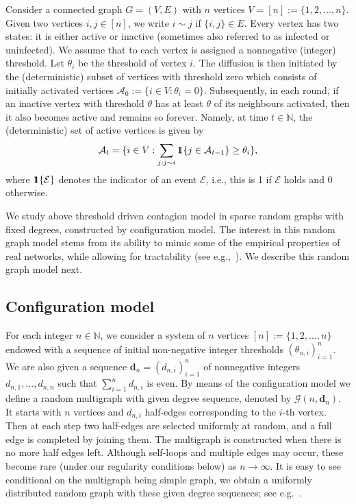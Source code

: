 \documentclass[11pt]{article}
\def\NN{\mathbb{N}}
\def\ind{{\rm 1\hspace{-0.90ex}1}}
\newcommand{\cE}{\mathcal{E}}
\newcommand{\cA}{\mathcal{A}}
\newcommand{\cG}{\mathcal{G}}
\newcommand\bd{\mathbf{d}}
\begin{document}
Consider a connected graph $G=(V,E)$ with $n$ vertices $V=[n]:=\{1,2, \dots, n\}$. Given two vertices $i,j \in [n]$, we write $i \sim j$ if $\{i,j\} \in E$. Every vertex has two states: it is either active or inactive (sometimes also referred to as infected or uninfected). We assume that to each vertex is assigned a  nonnegative (integer) threshold. Let $\theta_i$ be the threshold of vertex $i$. The diffusion is then initiated by the (deterministic) subset of vertices with threshold zero which consists of initially activated vertices 
$\cA_0:=\{i\in V: \theta_i=0\}.$ Subsequently, in each round, if an inactive vertex with threshold $\theta$ has at least $\theta$ of its neighbours activated, then it also becomes active and remains so forever. Namely, at time $t\in \NN$, the (deterministic) set of active vertices is given by
\begin{equation}
\cA_{t}=\{i\in V: \sum_{j: j\sim i} \ind{\{j\in \cA_{t-1}\}} \geq \theta_i\},
\end{equation}
where $\ind{\{\cE\}}$  denotes the indicator of an event $\cE$, i.e., this is 1 if $\cE$ holds and 0 otherwise.


We study above threshold driven contagion model in sparse random graphs with fixed degrees, constructed by configuration model. The interest in this random graph model stems from its ability to mimic some of the empirical properties of real networks, while allowing for tractability (see e.g.,~\cite{Molloy95, hofstad16, durrett07}). We describe this random graph model next.




\subsection{Configuration model}

For each integer $n\in \mathbb{N}$, we consider a system of $n$ vertices $[n] :=\{1,2, \dots,n\}$ endowed with a sequence of initial non-negative integer thresholds $(\theta_{n,i})_{i=1}^n$. We are also given a sequence $\bd_n = (d_{n,i})_{i=1}^n$ of nonnegative integers
$d_{n,1},\ldots,d_{n,n}$ such that $\sum_{i=1}^n d_{n,i}$ is even. By means of the configuration model we define a random multigraph with given degree sequence, denoted by $\cG(n,\bd_n)$. It starts with $n$ vertices and $d_{n,i}$ half-edges corresponding to the $i$-th vertex. Then at each step two half-edges are selected uniformly at random, and a full edge is completed by joining them. The multigraph is constructed when there is no more half edges left. Although self-loops and multiple edges may occur, these become rare (under our regularity conditions below) as $n \to \infty$. It is easy to see conditional on the multigraph being simple graph, we obtain a uniformly distributed random graph with these given degree sequences; see e.g.~\cite{hofstad16}.
\end{document}
